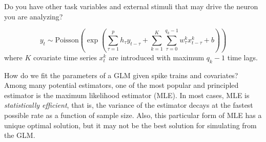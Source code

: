 \documentclass[letterpaper,11pt]{exam}
\newcounter{homework}
\newcommand{\homework}{\stepcounter{homework}\textcolor{violet}{\textbf{Homework \thehomework:}~}}
\newcommand{\funfact}{\textbf{Fun Fact:}~}
\begin{document}
\begin{questions}

\newpage
Do you have other task variables and external stimuli that may drive the neuron you are analyzing\cite{Park2014d}?
\begin{tcolorbox}[colback=red!5!white,colframe=red!50!black,title=GLM with covariates]
\begin{equation}\label{eq:GLM2}
    y_t \sim \text{Poisson}\left(\exp\left( \sum_{\tau=1}^p h_\tau y_{t-\tau} + \sum_{k=1}^K \sum_{\tau=0}^{q_k-1} w^k_\tau x^k_{t-\tau} + b\right)\right)
\end{equation}
where $K$ covariate time series $x^k_t$ are introduced with maximum $q_k-1$ time lags.
\end{tcolorbox}
How do we fit the parameters of a GLM given spike trains and covariates?
Among many potential estimators, one of the most popular and principled estimator is the maximum likelihood estimator (MLE).
In most cases, MLE is \emph{statistically efficient}, that is, the variance of the estimator decays at the fastest possible rate as a function of sample size.
Also, this particular form of MLE has a unique optimal solution, but it may not be the best solution for simulating from the GLM\cite{Arribas2020a}.


\end{questions}
\end{document}
